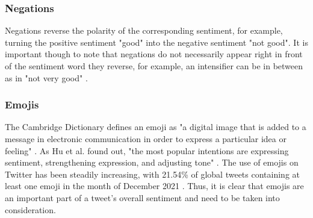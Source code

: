 \subsubsection{Negations}
Negations reverse the polarity of the corresponding sentiment, for example, turning the positive sentiment "good" into the negative sentiment "not good". It is important though to note that negations do not necessarily appear right in front of the sentiment word they reverse, for example, an intensifier can be in between as in "not very good" \cite{taboada}.

\subsubsection{Emojis}
The Cambridge Dictionary defines an emoji as "a digital image that is added to a message in electronic communication in order to express a particular idea or feeling" \cite{cambridgeEmoji}. As Hu et al. found out, "the most popular intentions are expressing sentiment, strengthening expression, and adjusting tone" \cite[p.~109]{Hu_Guo_Sun_Nguyen_Luo_2017}. The use of emojis on Twitter has been steadily increasing, with 21.54\% of global tweets containing at least one emoji in the month of December 2021 \cite{emojiStatistic}. Thus, it is clear that emojis are an important part of a tweet's overall sentiment and need to be taken into consideration.








